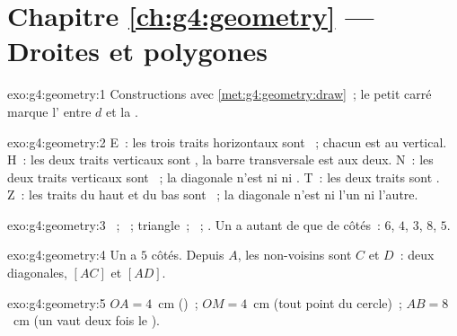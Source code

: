 \section*{Chapitre \ref{ch:g4:geometry} --- Droites et polygones}

\begin{solution}{exo:g4:geometry:1}
Constructions avec \cref{met:g4:geometry:draw}~; le petit carré
marque l' entre $d$ et la .
\end{solution}

\begin{solution}{exo:g4:geometry:2}
E~: les trois traits horizontaux sont ~; chacun est
 au vertical. H~: les deux traits verticaux sont
, la barre transversale est  aux deux.
N~: les deux traits verticaux sont ~; la diagonale
n'est ni  ni . T~: les deux traits sont
. Z~: les traits du haut et du bas sont
~; la diagonale n'est ni l'un ni l'autre.
\end{solution}

\begin{solution}{exo:g4:geometry:3}
~; ~; triangle~; ~; . Un
 a autant de  que de côtés~: $6$, $4$, $3$, $8$,
$5$.
\end{solution}

\begin{solution}{exo:g4:geometry:4}
Un  a $5$ côtés. Depuis $A$, les non-voisins sont $C$ et
$D$~: deux diagonales, $[AC]$ et $[AD]$.
\end{solution}

\begin{solution}{exo:g4:geometry:5}
$OA = 4$~cm ()~; $OM = 4$~cm (tout point du cercle)~;
$AB = 8$~cm (un  vaut deux fois le ).
\end{solution}

